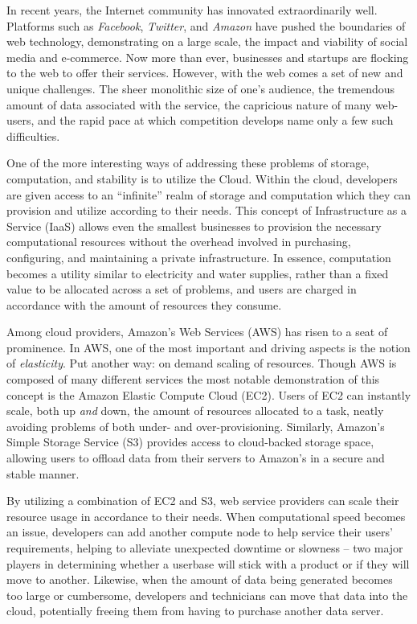 In recent years, the Internet community has innovated extraordinarily well.
Platforms such as \emph{Facebook}, \emph{Twitter}, and \emph{Amazon} have
pushed the boundaries of web technology, demonstrating on a large scale, the
impact and viability of social media and e-commerce. Now more than ever,
businesses and startups are flocking to the web to offer their services.
However, with the web comes a set of new and unique challenges. The sheer
monolithic size of one's audience, the tremendous amount of data associated
with the service, the capricious nature of many web-users, and the rapid pace
at which competition develops name only a few such difficulties.

One of the more interesting ways of addressing these problems of storage,
computation, and stability is to utilize the Cloud. Within the cloud,
developers are given access to an ``infinite'' realm of storage and computation
which they can provision and utilize according to their needs. This concept of
Infrastructure as a Service (IaaS) allows even the smallest businesses to
provision the necessary computational resources without the overhead involved
in purchasing, configuring, and maintaining a private infrastructure. In
essence, computation becomes a utility similar to electricity and water
supplies, rather than a fixed value to be allocated across a set of problems,
and users are charged in accordance with the amount of resources they consume.

Among cloud providers, Amazon's Web Services (AWS) has risen to a seat of
prominence. In AWS, one of the most important and driving aspects is the notion
of \emph{elasticity}. Put another way: on demand scaling of resources. Though
AWS is composed of many different services the most notable demonstration of
this concept is the Amazon Elastic Compute Cloud (EC2). Users of EC2 can
instantly scale, both up \emph{and} down, the amount of resources allocated to
a task, neatly avoiding problems of both under- and over-provisioning.
Similarly, Amazon's Simple Storage Service (S3) provides access to cloud-backed
storage space, allowing users to offload data from their servers to Amazon's in
a secure and stable manner.

By utilizing a combination of EC2 and S3, web service providers can scale their
resource usage in accordance to their needs. When computational speed becomes
an issue, developers can add another compute node to help service their users'
requirements, helping to alleviate unexpected downtime or slowness -- two major
players in determining whether a userbase will stick with a product or if they
will move to another. Likewise, when the amount of data being generated becomes
too large or cumbersome, developers and technicians can move that data into the
cloud, potentially freeing them from having to purchase another data server.


